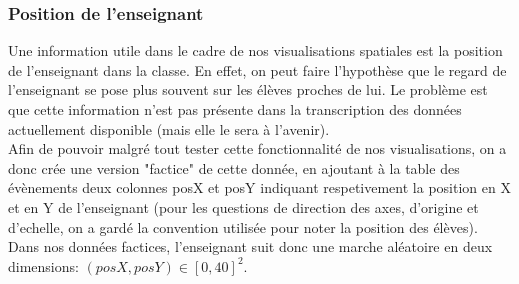 \documentclass{article}
\begin{document}
\subsubsection{Position de l'enseignant}
Une information utile dans le cadre de nos visualisations spatiales est la position de l'enseignant dans la classe. En effet, on peut faire l'hypothèse que le regard de l'enseignant se pose plus souvent sur les élèves proches de lui. Le problème est que cette information n'est pas présente dans la transcription des données actuellement disponible (mais elle le sera à l'avenir).\\
Afin de pouvoir malgré tout tester cette fonctionnalité de nos visualisations, on a donc crée une version "factice" de cette donnée, en ajoutant à la table des évènements deux colonnes posX et posY indiquant respetivement la position en X et en Y de l'enseignant (pour les questions de direction des axes, d'origine et d'echelle, on a gardé la convention utilisée pour noter la position des élèves). Dans nos données factices, l'enseignant suit donc une marche aléatoire en deux dimensions: $(posX, posY) \in [0, 40]^2$.
\end{document}
